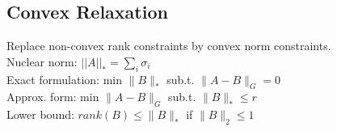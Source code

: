 \subsection*{Convex Relaxation}
Replace non-convex rank constraints by convex norm constraints.\\
Nuclear norm: $||A||_* = \sum_i \sigma_i$ \\
Exact formulation: min $\|B\|_*$ sub.t. $\|A-B\|_G=0$ \\
Approx. form: min $\|A - B\|_G$ sub.t. $\|B\|_* \leq r$ \\
Lower bound: $rank(B) \leq \|B\|_*$ if $\|B\|_2 \leq 1$